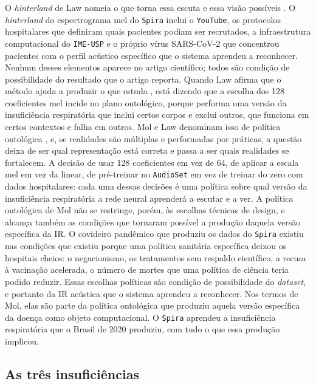 O \textit{hinterland} de Law nomeia o que torna essa escuta e essa visão possíveis \parencite{Law2004After}. O \textit{hinterland} do espectrograma mel do \texttt{Spira} inclui o \texttt{YouTube}, os protocolos hospitalares que definiram quais pacientes podiam ser recrutados, a infraestrutura computacional do \texttt{IME-USP} e o próprio vírus SARS-CoV-2 que concentrou pacientes com o perfil acústico específico que o sistema aprendeu a reconhecer. Nenhum desses elementos aparece no artigo científico; todos são condição de possibilidade do resultado que o artigo reporta. Quando Law afirma que o método ajuda a produzir o que estuda \parencite{Law2004After}, está dizendo que a escolha dos 128 coeficientes mel incide no plano ontológico, porque performa uma versão da insuficiência respiratória que inclui certos corpos e exclui outros, que funciona em certos contextos e falha em outros. Mol e Law denominam isso de política ontológica \parencite{mol1999ontological}, e, se realidades são múltiplas e performadas por práticas, a questão deixa de ser qual representação está correta e passa a ser quais realidades se fortalecem. A decisão de usar 128 coeficientes em vez de 64, de aplicar a escala mel em vez da linear, de pré-treinar no \texttt{AudioSet} em vez de treinar do zero com dados hospitalares: cada uma dessas decisões é uma política sobre qual versão da insuficiência respiratória a rede neural aprenderá a escutar e a ver. A política ontológica de Mol não se restringe, porém, às escolhas técnicas de design, e alcança também as condições que tornaram possível a produção daquela versão específica da IR. O covideiro pandêmico que produziu os dados do \texttt{Spira} existiu nas condições que existiu porque uma política sanitária específica deixou os hospitais cheios: o negacionismo, os tratamentos sem respaldo científico, a recusa à vacinação acelerada, o número de mortes que uma política de ciência teria podido reduzir. Essas escolhas políticas são condição de possibilidade do \textit{dataset}, e portanto da IR acústica que o sistema aprendeu a reconhecer. Nos termos de Mol, elas são parte da política ontológica que produziu aquela versão específica da doença como objeto computacional. O \texttt{Spira} aprendeu a insuficiência respiratória que o Brasil de 2020 produziu, com tudo o que essa produção implicou.

\subsection{As três insuficiências}
\label{subsec:tres_insuficiencias}

